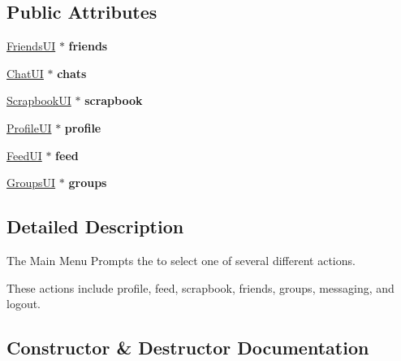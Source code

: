 \subsection*{Public Attributes}
\begin{DoxyCompactItemize}
\item 
\hyperlink{classFriendsUI}{Friends\+UI} $\ast$ {\bfseries friends}\hypertarget{classMainMenu_ac05fadacf74b5741d0b8ce500596bae3}{}\label{classMainMenu_ac05fadacf74b5741d0b8ce500596bae3}

\item 
\hyperlink{classChatUI}{Chat\+UI} $\ast$ {\bfseries chats}\hypertarget{classMainMenu_a5cdb3f46d4d1caba34a2fa78bf90229c}{}\label{classMainMenu_a5cdb3f46d4d1caba34a2fa78bf90229c}

\item 
\hyperlink{classScrapbookUI}{Scrapbook\+UI} $\ast$ {\bfseries scrapbook}\hypertarget{classMainMenu_a83d3d33ace5e26e52965648514f14f41}{}\label{classMainMenu_a83d3d33ace5e26e52965648514f14f41}

\item 
\hyperlink{classProfileUI}{Profile\+UI} $\ast$ {\bfseries profile}\hypertarget{classMainMenu_adcd9f278a7861cc7cc8db31ea8db804b}{}\label{classMainMenu_adcd9f278a7861cc7cc8db31ea8db804b}

\item 
\hyperlink{classFeedUI}{Feed\+UI} $\ast$ {\bfseries feed}\hypertarget{classMainMenu_a9347d630d6a161d91d822f00e6542859}{}\label{classMainMenu_a9347d630d6a161d91d822f00e6542859}

\item 
\hyperlink{classGroupsUI}{Groups\+UI} $\ast$ {\bfseries groups}\hypertarget{classMainMenu_a11b7a11b936f917358f5c44f177f3bd0}{}\label{classMainMenu_a11b7a11b936f917358f5c44f177f3bd0}

\end{DoxyCompactItemize}


\subsection{Detailed Description}
The Main Menu Prompts the to select one of several different actions. 

These actions include profile, feed, scrapbook, friends, groups, messaging, and logout. 

\subsection{Constructor \& Destructor Documentation}
